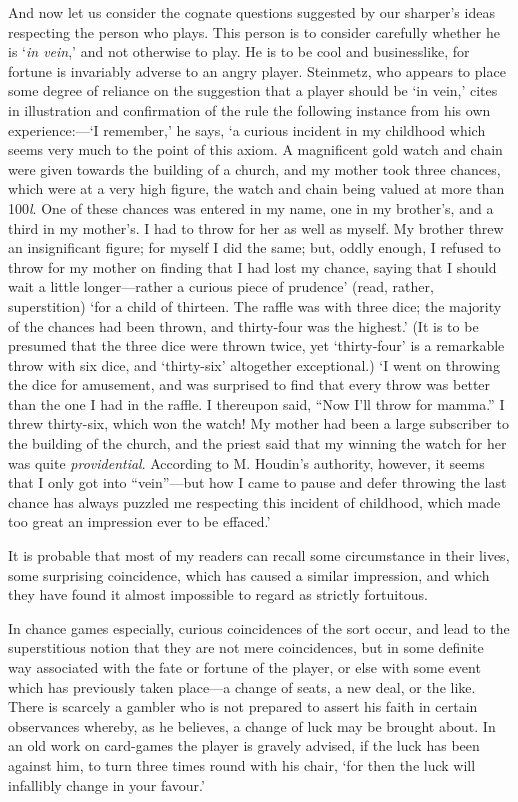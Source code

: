 \documentclass[letterpaper,12pt,oneside,openany]{memoir}
\begin{document}
And now let us consider the cognate questions suggested
by our sharper's ideas respecting the person who
plays. This person is to consider carefully whether he
is `\textit{in vein},' and not otherwise to play. He is to be
cool and businesslike, for fortune is invariably adverse
to an angry player. Steinmetz, who appears to place
some degree of reliance on the suggestion that a player
should be `in vein,' cites in illustration and confirmation
of the rule the following instance from his own
experience:---`I remember,' he says, `a curious incident
in my childhood which seems very much to the
point of this axiom. A magnificent gold watch and
chain were given towards the building of a church, and
my mother took three chances, which were at a very
high figure, the watch and chain being valued at more
than 100\textit{l}. One of these chances was entered in my
name, one in my brother's, and a third in my mother's.
I had to throw for her as well as myself. My brother
threw an insignificant figure; for myself I did the
same; but, oddly enough, I refused to throw for my
mother on finding that I had lost my chance, saying
that I should wait a little longer---rather a curious
piece of prudence' (read, rather, superstition) `for a
child of thirteen. The raffle was with three dice; the
majority of the chances had been thrown, and thirty-four
was the highest.' (It is to be presumed that the
three dice were thrown twice, yet `thirty-four' is
a remarkable throw with six dice, and `thirty-six'
altogether exceptional.) `I went on throwing the
dice for amusement, and was surprised to find that
every throw was better than the one I had in the raffle.
I thereupon said, ``Now I'll throw for mamma.'' I threw
thirty-six, which won the watch! My mother had been
a large subscriber to the building of the church, and
the priest said that my winning the watch for her was
quite \textit{providential}. According to M. Houdin's authority,
however, it seems that I only got into ``vein''---but
how I came to pause and defer throwing the last
chance has always puzzled me respecting this incident
of childhood, which made too great an impression
ever to be effaced.'

It is probable that most of my readers can recall
some circumstance in their lives, some surprising coincidence,
which has caused a similar impression, and
which they have found it almost impossible to regard
as strictly fortuitous.

In chance games especially, curious coincidences
of the sort occur, and lead to the superstitious notion
that they are not mere coincidences, but in some definite
way associated with the fate or fortune of the player, or
else with some event which has previously taken place---a
change of seats, a new deal, or the like. There is
scarcely a gambler who is not prepared to assert his
faith in certain observances whereby, as he believes, a
change of luck may be brought about. In an old work
on card-games the player is gravely advised, if the luck
has been against him, to turn three times round with
his chair, `for then the luck will infallibly change in
your favour.'
\end{document}

